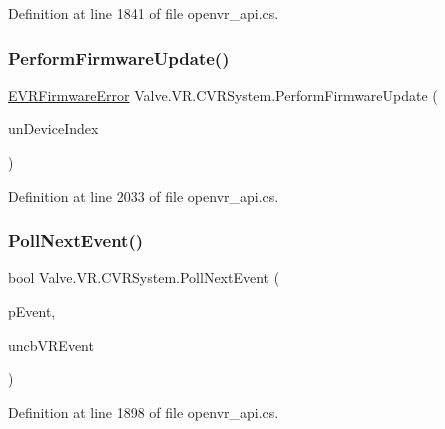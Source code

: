 Definition at line 1841 of file openvr\+\_\+api.\+cs.

\mbox{\label{class_valve_1_1_v_r_1_1_c_v_r_system_a807bef2cd4ed9817b4f1bfe06fafe6f9}} 
\subsubsection{\texorpdfstring{PerformFirmwareUpdate()}{PerformFirmwareUpdate()}}
{\footnotesize\ttfamily \mbox{\hyperlink{namespace_valve_1_1_v_r_a07c3927041d6bb490e61ca27612c41ff}{E\+V\+R\+Firmware\+Error}} Valve.\+V\+R.\+C\+V\+R\+System.\+Perform\+Firmware\+Update (\begin{DoxyParamCaption}\item[{uint}]{un\+Device\+Index }\end{DoxyParamCaption})}



Definition at line 2033 of file openvr\+\_\+api.\+cs.

\mbox{\label{class_valve_1_1_v_r_1_1_c_v_r_system_a1680564a6dab625afe34b14d4920a263}} 
\subsubsection{\texorpdfstring{PollNextEvent()}{PollNextEvent()}}
{\footnotesize\ttfamily bool Valve.\+V\+R.\+C\+V\+R\+System.\+Poll\+Next\+Event (\begin{DoxyParamCaption}\item[{ref \mbox{\hyperlink{struct_valve_1_1_v_r_1_1_v_r_event__t}{V\+R\+Event\+\_\+t}}}]{p\+Event,  }\item[{uint}]{uncb\+V\+R\+Event }\end{DoxyParamCaption})}



Definition at line 1898 of file openvr\+\_\+api.\+cs.

\mbox{\label{class_valve_1_1_v_r_1_1_c_v_r_system_a95d7cf29714d23acf0e6a6748370e788}} 
